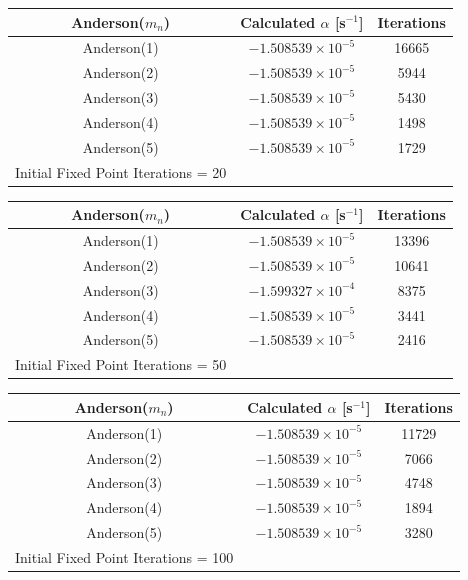\begin{table}[!htbp]\ContinuedFloat
	\begin{subtable}[h]{1.0\textwidth}
	\centering{}
	\begin{tabular}{@{}ccc@{}}\toprule
	Anderson($m_{n}$) & Calculated $\alpha$ [s$^{-1}$] & Iterations \\
	\midrule
	Anderson(1) & $-1.508539 \times 10^{-5}$ & 16665 \\
	Anderson(2) & $-1.508539 \times 10^{-5}$ & 5944 \\
	Anderson(3) & $-1.508539 \times 10^{-5}$ & 5430 \\
	Anderson(4) & $-1.508539 \times 10^{-5}$ & 1498 \\
	Anderson(5) & $-1.508539 \times 10^{-5}$ & 1729 \\
	\bottomrule
	Initial Fixed Point Iterations = 20
	\end{tabular}
	\end{subtable}%
	\vspace{0.25cm}
	\begin{subtable}[h]{1.0\textwidth}
	\centering{}
	\begin{tabular}{@{}ccc@{}}\toprule
	Anderson($m_{n}$) & Calculated $\alpha$ [s$^{-1}$] & Iterations \\
	\midrule
	Anderson(1) & $-1.508539 \times 10^{-5}$ & 13396 \\
	Anderson(2) & $-1.508539 \times 10^{-5}$ & 10641 \\
	Anderson(3) & $-1.599327 \times 10^{-4}$ & 8375 \\
	Anderson(4) & $-1.508539 \times 10^{-5}$ & 3441 \\
	Anderson(5) & $-1.508539 \times 10^{-5}$ & 2416 \\
	\bottomrule
	Initial Fixed Point Iterations = 50
	\end{tabular}
	\end{subtable}%
	\vspace{0.25cm}
	\begin{subtable}[h]{1.0\textwidth}
	\centering{}
	\begin{tabular}{@{}ccc@{}}\toprule
	Anderson($m_{n}$) & Calculated $\alpha$ [s$^{-1}$] & Iterations \\
	\midrule
	Anderson(1) & $-1.508539 \times 10^{-5}$ & 11729 \\
	Anderson(2) & $-1.508539 \times 10^{-5}$ & 7066 \\
	Anderson(3) & $-1.508539 \times 10^{-5}$ & 4748 \\
	Anderson(4) & $-1.508539 \times 10^{-5}$ & 1894 \\
	Anderson(5) & $-1.508539 \times 10^{-5}$ & 3280 \\
	\bottomrule
	Initial Fixed Point Iterations = 100
	\end{tabular}
	\end{subtable}
\end{table}

